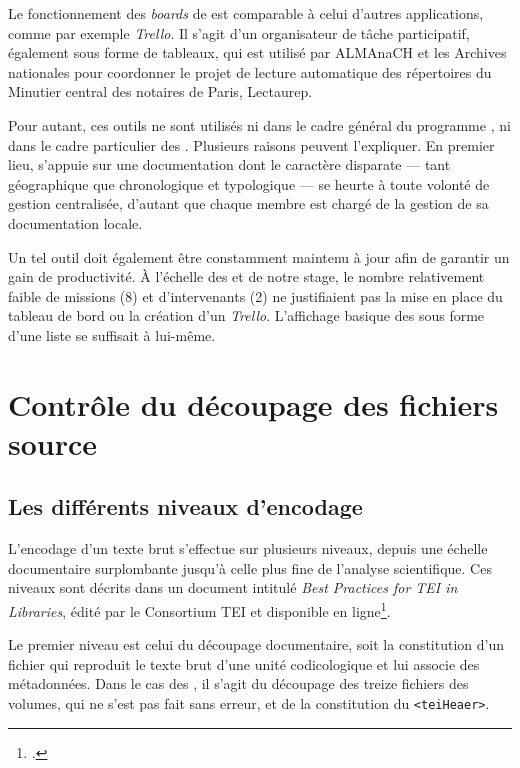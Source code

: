 Le fonctionnement des \textit{boards} de \gitlab{} est comparable à celui d'autres applications, comme par exemple \textit{Trello}. Il s'agit d'un organisateur de tâche participatif, également sous forme de tableaux, qui est utilisé par ALMAnaCH et les Archives nationales pour coordonner le projet de lecture automatique des répertoires du Minutier central des notaires de Paris, Lectaurep.

Pour autant, ces outils ne sont utilisés ni dans le cadre général du programme \timeus, ni dans le cadre particulier des \odm. Plusieurs raisons peuvent l'expliquer. En premier lieu, \timeus{} s'appuie sur une documentation dont le caractère disparate --- tant géographique que chronologique et typologique --- se heurte à toute volonté de gestion centralisée, d'autant que chaque membre est chargé de la gestion de sa documentation locale.

Un tel outil doit également être constamment maintenu à jour afin de garantir un gain de productivité. À l'échelle des \odm{} et de notre stage, le nombre relativement faible de missions (8) et d'intervenants (2) ne justifiaient pas la mise en place du tableau de bord \gitlab{} ou la création d'un \textit{Trello}. L'affichage basique des \issues{} sous forme d'une liste se suffisait à lui-même.

\newpage
\thispagestyle{empty}
\mbox{}
\newpage

\chapter{Contrôle du découpage des fichiers source}

\section{Les différents niveaux d'encodage}

L'encodage d'un texte brut s'effectue sur plusieurs niveaux, depuis une échelle documentaire surplombante jusqu'à celle plus fine de l'analyse scientifique. Ces niveaux sont décrits dans un document intitulé \textit{Best Practices for TEI in Libraries}, édité par le Consortium TEI et disponible en ligne\footcite[\textit{4.2. Encoding Levels}]{bestpratice}.

Le premier niveau est celui du découpage documentaire, soit la constitution d'un fichier qui reproduit le texte brut d'une unité codicologique et lui associe des métadonnées. Dans le cas des \odm, il s'agit du découpage des treize fichiers des volumes, qui ne s'est pas fait sans erreur, et de la constitution du \texttt{<teiHeaer>}.

